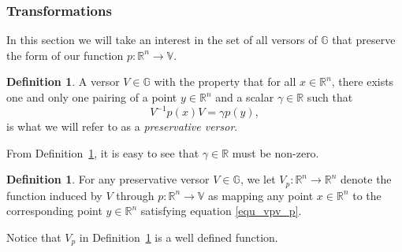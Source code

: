 \documentclass{birkjour}
\theoremstyle{definition}
\newtheorem{defn}[thm]{Definition}
\theoremstyle{remark}
\numberwithin{equation}{section}
\newcommand{\R}{\mathbb{R}}
\newcommand{\G}{\mathbb{G}}
\newcommand{\V}{\mathbb{V}}
\begin{document}
\subsubsection{Transformations}

In this section we will take an interest in the set of all versors of $\G$ that preserve the form
of our function $p:\R^n\to\V$.
\begin{defn}\label{def_preservative_versor}
A versor $V\in\G$ with the property that for all $x\in\R^n$, there exists one and only one
pairing of a point $y\in\R^n$ and a scalar $\gamma\in\R$ such that
\begin{equation}\label{equ_vpv_p}
V^{-1}p(x)V = \gamma p(y),
\end{equation}
is what we will refer to as a {\it preservative versor}.
\end{defn}

From Definition~\ref{def_preservative_versor}, it is easy to see that $\gamma\in\R$ must be non-zero.

\begin{defn}\label{def_preservative_versor_induced_func}
For any preservative versor $V\in\G$, we let $V_p:\R^n\to\R^n$ denote
the function induced by $V$ through $p:\R^n\to\V$ as mapping any point $x\in\R^n$
to the corresponding point $y\in\R^n$ satisfying equation \eqref{equ_vpv_p}.
\end{defn}

Notice that $V_p$ in Definition~\ref{def_preservative_versor_induced_func} is a well defined function.
\end{document}
